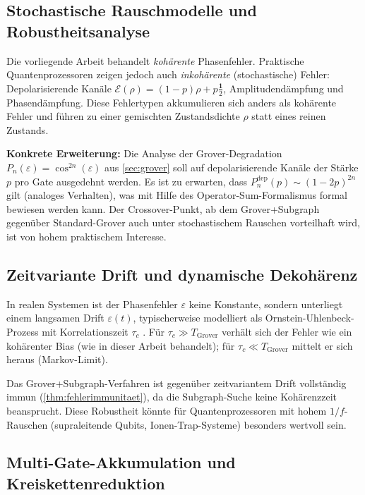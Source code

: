 ﻿\documentclass[11pt,a4paper]{article}
\theoremstyle{definition}
\begin{document}
\subsection{Stochastische Rauschmodelle und Robustheitsanalyse}
\label{subsec:outlook_stoch}

Die vorliegende Arbeit behandelt \emph{kohärente} Phasenfehler.  Praktische
Quantenprozessoren zeigen jedoch auch \emph{inkohärente} (stochastische) Fehler:
Depolarisierende Kanäle $\mathcal{E}(\rho) = (1-p)\rho + p\tfrac{\mathbf{1}}{2}$,
Amplitudendämpfung und Phasendämpfung.  Diese Fehlertypen akkumulieren sich
anders als kohärente Fehler und führen zu einer gemischten Zustandsdichte $\rho$
statt eines reinen Zustands.

\textbf{Konkrete Erweiterung:}  Die Analyse der Grover-Degradation
$P_n(\varepsilon) = \cos^{2n}(\varepsilon)$ aus \cref{sec:grover} soll auf
depolarisierende Kanäle der Stärke $p$ pro Gate ausgedehnt werden.
Es ist zu erwarten, dass $P_n^{\mathrm{dep}}(p) \sim (1-2p)^{2n}$ gilt
(analoges Verhalten), was mit Hilfe des Operator-Sum-Formalismus
\cite{Nielsen2000} formal bewiesen werden kann.  Der Crossover-Punkt, ab dem
Grover+Subgraph gegenüber Standard-Grover auch unter stochastischem Rauschen
vorteilhaft wird, ist von hohem praktischem Interesse.

\subsection{Zeitvariante Drift und dynamische Dekohärenz}
\label{subsec:outlook_drift}

In realen Systemen ist der Phasenfehler $\varepsilon$ keine Konstante, sondern
unterliegt einem langsamen Drift $\varepsilon(t)$, typischerweise modelliert
als Ornstein-Uhlenbeck-Prozess mit Korrelationszeit $\tau_c$ \cite{Bylander2011}.
Für $\tau_c \gg T_{\mathrm{Grover}}$ verhält sich der Fehler wie ein
kohärenter Bias (wie in dieser Arbeit behandelt); für $\tau_c \ll T_{\mathrm{Grover}}$
mittelt er sich heraus (Markov-Limit).

Das Grover+Subgraph-Verfahren ist gegenüber zeitvariantem Drift vollständig
immun (\cref{thm:fehlerimmunitaet}), da die Subgraph-Suche keine Kohärenzzeit
beansprucht.  Diese Robustheit könnte für Quantenprozessoren mit hohem
$1/f$-Rauschen (supraleitende Qubits, Ionen-Trap-Systeme) besonders wertvoll sein.

\subsection{Multi-Gate-Akkumulation und Kreiskettenreduktion}
\label{subsec:outlook_multigate}
\end{document}
